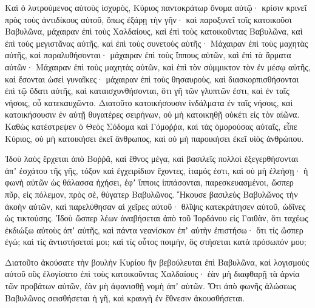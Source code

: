 {Καὶ ὁ λυτρούμενος αὐτοὺς ἰσχυρὸς, Κύριος παντοκράτωρ ὄνομα αὐτῷ· κρίσιν κρινεῖ πρὸς τοὺς ἀντιδίκους αὐτοῦ, ὅπως ἐξάρῃ τὴν γῆν· καὶ παροξυνεῖ τοῖς κατοικοῦσι Βαβυλῶνα,
μάχαιραν ἐπὶ τοὺς Χαλδαίους, καὶ ἐπὶ τοὺς κατοικοῦντας Βαβυλῶνα, καὶ ἐπὶ τοὺς μεγιστᾶνας αὐτῆς, καὶ ἐπὶ τοὺς συνετοὺς αὐτῆς·
Μάχαιραν ἐπὶ τοὺς μαχητὰς αὐτῆς, καὶ παραλυθήσονται· μάχαιραν ἐπὶ τοὺς ἵππους αὐτῶν, καὶ ἐπὶ τὰ ἅρματα αὐτῶν·
Μάχαιραν ἐπὶ τοὺς μαχητὰς αὐτῶν, καὶ ἐπὶ τὸν σύμμικτον τὸν ἐν μέσῳ αὐτῆς, καὶ ἔσονται ὡσεὶ γυναῖκες· μάχαιραν ἐπὶ τοὺς θησαυροὺς, καὶ διασκορπισθήσονται
ἐπὶ τῷ ὕδατι αὐτῆς, καὶ καταισχυνθήσονται, ὅτι γῆ τῶν γλυπτῶν ἐστι, καὶ ἐν ταῖς νήσοις, οὗ κατεκαυχῶντο.
Διατοῦτο κατοικήσουσιν ἰνδάλματα ἐν ταῖς νήσοις, καὶ κατοικήσουσιν ἐν αὐτῇ θυγατέρες σειρήνων, οὐ μὴ κατοικηθῇ οὐκέτι εἰς τὸν αἰῶνα.
Καθὼς κατέστρεψεν ὁ Θεὸς Σόδομα καὶ Γόμοῤῥα, καὶ τὰς ὁμορούσας αὐταῖς, εἶπε Κύριος, οὐ μὴ κατοικήσει ἐκεῖ ἄνθρωπος, καὶ οὐ μὴ παροικήσει ἐκεῖ υἱὸς ἀνθρώπου.
\par }{\PP {}Ἰδοὺ λαὸς ἔρχεται ἀπὸ Βοῤῥᾶ, καὶ ἔθνος μέγα, καὶ βασιλεῖς πολλοὶ ἐξεγερθήσονται ἀπʼ ἐσχάτου τῆς γῆς,
τόξον καὶ ἐγχειρίδιον ἔχοντες, ἰταμός ἐστι, καὶ οὐ μὴ ἐλεήσῃ· ἡ φωνὴ αὐτῶν ὡς θάλασσα ἠχήσει, ἐφʼ ἵπποις ἱππάσονται, παρεσκευασμένοι, ὥσπερ πῦρ, εἰς πόλεμον, πρὸς σὲ, θύγατερ Βαβυλῶνος.
Ἤκουσε βασιλεὺς Βαβυλῶνος τὴν ἀκοὴν αὐτῶν, καὶ παρελύθησαν αἱ χεῖρες αὐτοῦ· θλῖψις κατεκράτησεν αὐτοῦ, ὠδῖνες ὡς τικτούσης.
Ἰδοὺ ὥσπερ λέων ἀναβήσεται ἀπὸ τοῦ Ἰορδάνου εἰς Γαιθὰν, ὅτι ταχέως ἐκδιώξω αὐτοὺς ἀπʼ αὐτῆς, καὶ πάντα νεανίσκον ἐπʼ αὐτὴν ἐπιστήσω· ὅτι τίς ὥσπερ ἐγώ; καὶ τίς ἀντιστήσεταί μοι; καὶ τίς οὗτος ποιμὴν, ὃς στήσεται κατὰ πρόσωπόν μου;
\par }{\PP {}Διατοῦτο ἀκούσατε τὴν βουλὴν Κυρίου ἣν βεβούλευται ἐπὶ Βαβυλῶνα, καὶ λογισμοὺς αὐτοῦ οὓς ἐλογίσατο ἐπὶ τοὺς κατοικοῦντας Χαλδαίους· ἐὰν μὴ διαφθαρῇ τὰ ἀρνία τῶν προβάτων αὐτῶν, ἐὰν μὴ ἀφανισθῇ νομὴ ἀπʼ αὐτῶν.
Ὅτι ἀπὸ φωνῆς ἁλώσεως Βαβυλῶνος σεισθήσεται ἡ γῆ, καὶ κραυγὴ ἐν ἔθνεσιν ἀκουσθήσεται.

}
